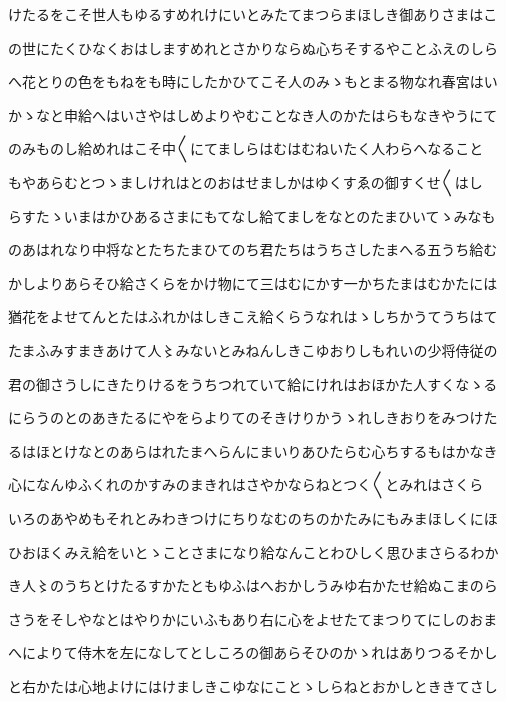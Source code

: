 \documentclass[a4paper,11pt,landscape]{ltjtarticle}
\begin{document}
\par\medskip
けたるをこそ世人もゆるすめれけにいとみたてまつらまほしき御ありさまはこ
\par\medskip
の世にたくひなくおはしますめれとさかりならぬ心ちそするやことふえのしら
\par\medskip
へ花とりの色をもねをも時にしたかひてこそ人のみゝもとまる物なれ春宮はい
\par\medskip
かゝなと申給へはいさやはしめよりやむことなき人のかたはらもなきやうにて
\par\medskip
のみものし給めれはこそ中〱にてましらはむはむねいたく人わらへなること
\par\medskip
もやあらむとつゝましけれはとのおはせましかはゆくすゑの御すくせ〱はし
\par\medskip
らすたゝいまはかひあるさまにもてなし給てましをなとのたまひいてゝみなも
\par\medskip
のあはれなり中将なとたちたまひてのち君たちはうちさしたまへる五うち給む
\par\medskip
かしよりあらそひ給さくらをかけ物にて三はむにかす一かちたまはむかたには
\par\medskip
猶花をよせてんとたはふれかはしきこえ給くらうなれはゝしちかうてうちはて
\par\medskip
たまふみすまきあけて人〻みないとみねんしきこゆおりしもれいの少将侍従の
\par\medskip
君の御さうしにきたりけるをうちつれていて給にけれはおほかた人すくなゝる
\par\medskip
にらうのとのあきたるにやをらよりてのそきけりかうゝれしきおりをみつけた
\par\medskip
るはほとけなとのあらはれたまへらんにまいりあひたらむ心ちするもはかなき
\par\medskip
心になんゆふくれのかすみのまきれはさやかならねとつく〱とみれはさくら
\par\medskip
いろのあやめもそれとみわきつけにちりなむのちのかたみにもみまほしくにほ
\par\medskip
ひおほくみえ給をいとゝことさまになり給なんことわひしく思ひまさらるわか
\par\medskip
き人〻のうちとけたるすかたともゆふはへおかしうみゆ右かたせ給ぬこまのら
\par\medskip
さうをそしやなとはやりかにいふもあり右に心をよせたてまつりてにしのおま
\par\medskip
へによりて侍木を左になしてとしころの御あらそひのかゝれはありつるそかし
\par\medskip
と右かたは心地よけにはけましきこゆなにことゝしらねとおかしとききてさし
\par\medskip
\end{document}
